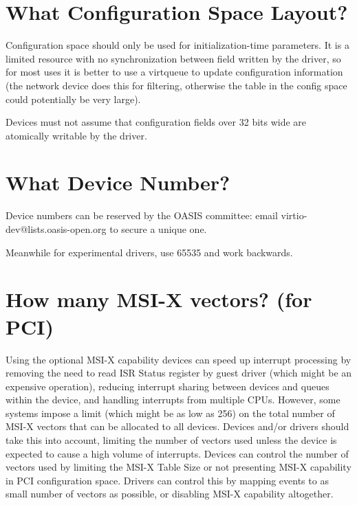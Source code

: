 \section{What Configuration Space Layout?}\label{sec:Creating New Device Types / What Configuration Space Layout?}

Configuration space should only be used for initialization-time
parameters.  It is a limited resource with no synchronization between
field written by the driver, so for most uses it is better to use a virtqueue to update
configuration information (the network device does this for filtering,
otherwise the table in the config space could potentially be very
large).

Devices must not assume that configuration fields over 32 bits wide
are atomically writable by the driver.

\section{What Device Number?}\label{sec:Creating New Device Types / What Device Number?}

Device numbers can be reserved by the OASIS committee: email
virtio-dev@lists.oasis-open.org to secure a unique one.

Meanwhile for experimental drivers, use 65535 and work backwards.

\section{How many MSI-X vectors?  (for PCI)}\label{sec:Creating New Device Types / How many MSI-X vectors?  (for PCI)}

Using the optional MSI-X capability devices can speed up
interrupt processing by removing the need to read ISR Status
register by guest driver (which might be an expensive operation),
reducing interrupt sharing between devices and queues within the
device, and handling interrupts from multiple CPUs. However, some
systems impose a limit (which might be as low as 256) on the
total number of MSI-X vectors that can be allocated to all
devices. Devices and/or drivers should take this into
account, limiting the number of vectors used unless the device is
expected to cause a high volume of interrupts. Devices can
control the number of vectors used by limiting the MSI-X Table
Size or not presenting MSI-X capability in PCI configuration
space. Drivers can control this by mapping events to as small
number of vectors as possible, or disabling MSI-X capability
altogether.

